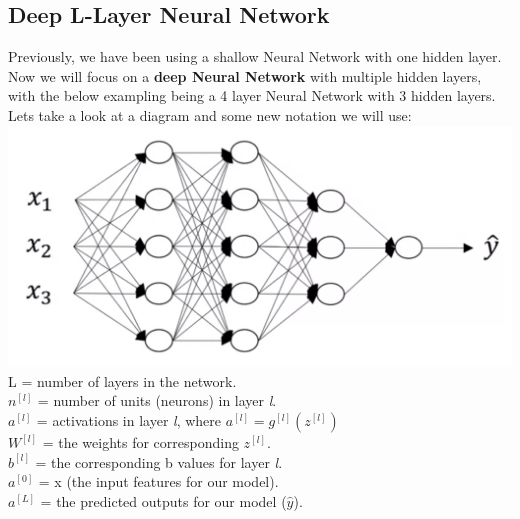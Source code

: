 \documentclass[11pt, a4paper]{article}
\begin{document}
\begin{spacing}{1.1}
	\subsection{Deep L-Layer Neural Network}
	Previously, we have been using a shallow Neural Network with one hidden layer. Now we will focus on a \textbf{deep Neural Network} with multiple hidden layers, with the below exampling being a 4 layer Neural Network with 3 hidden layers. Lets take a look at a diagram and some new notation we will use: \\
	\hspace*{30mm} \includegraphics[scale=0.45]{deep_nn} \vspace*{1mm} \\
	L = number of layers in the network. \\
	$n^{[l]}$ = number of units (neurons) in layer \textit{l}. \\
	$a^{[l]}$ = activations in layer \textit{l}, where $a^{[l]} = g^{[l]}(z^[l])$ \\
	$W^{[l]}$ = the weights for corresponding $z^{[l]}$. \\
	$b^{[l]}$ = the corresponding b values for layer \textit{l}. \\
	$a^{[0]}$ = x (the input features for our model). \\
	$a^{[L]}$ = the predicted outputs for our model ($\hat{y}$). \newpage


\end{spacing}
\end{document}
